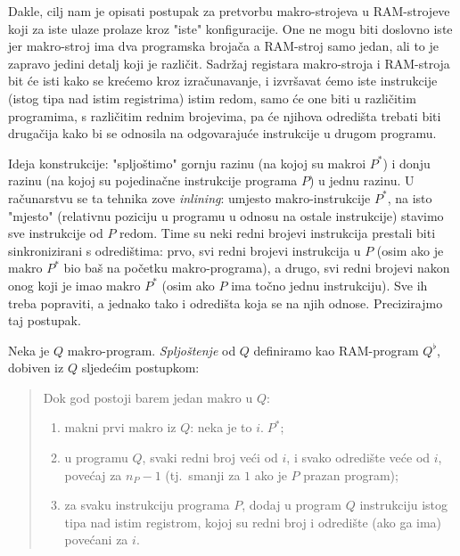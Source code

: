Dakle, cilj nam je opisati postupak za pretvorbu makro-strojeva u RAM-strojeve koji za iste ulaze prolaze kroz "iste" konfiguracije. One ne mogu biti doslovno iste jer makro-stroj ima dva programska brojača a RAM-stroj samo jedan, ali to je zapravo jedini detalj koji je različit. Sadržaj registara makro-stroja i RAM-stroja bit će isti kako se krećemo kroz izračunavanje, i izvršavat ćemo iste instrukcije (istog tipa nad istim registrima) istim redom, samo će one biti u različitim programima, s različitim rednim brojevima, pa će njihova odredišta trebati biti drugačija kako bi se odnosila na odgovarajuće instrukcije u drugom programu.

Ideja konstrukcije: "spljoštimo" gornju razinu (na kojoj su makroi $P^*$) i donju razinu (na kojoj su pojedinačne instrukcije programa $P$) u jednu razinu. U računarstvu se ta tehnika zove \emph{inlining}: umjesto makro-instrukcije $P^*$\!, na isto "mjesto" (relativnu poziciju u programu u odnosu na ostale instrukcije) stavimo sve instrukcije od $P$ redom. Time su neki redni brojevi instrukcija prestali biti sinkronizirani s odredištima: prvo, svi redni brojevi instrukcija u $P$ (osim ako je makro $P^*$ bio baš na početku makro-programa), a drugo, svi redni brojevi nakon onog koji je imao makro $P^*$ (osim ako $P$ ima točno jednu instrukciju). Sve ih treba popraviti, a jednako tako i odredišta koja se na njih odnose. Precizirajmo taj postupak.

\begin{definicija}[{name=[spljoštenje]}]\label{def:flat}
Neka je $Q$ makro-program. \emph{Spljoštenje} od $Q$ definiramo kao RAM-program $Q^\flat$, dobiven iz $Q$ sljedećim postupkom:
\begin{quotation}
Dok god postoji barem jedan makro u $Q$:
\begin{enumerate}
    \item\label{korak:makni} makni prvi makro iz $Q$: neka je to $i.\;P^*$;
    \item\label{korak:renumeriraj} u programu $Q$, svaki redni broj veći od $i$, i svako odredište veće od $i$, povećaj za $n_P-1$ (tj.\ smanji za $1$ ako je $P$ prazan program);
    \item\label{korak:dodaj} za svaku instrukciju programa $P$, dodaj u program $Q$ instrukciju istog tipa nad istim registrom, kojoj su redni broj i odredište (ako ga ima) povećani za $i$.\qedhere
\end{enumerate}
\end{quotation}
\end{definicija}

